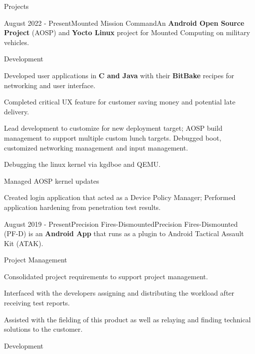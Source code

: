 \documentclass{article}
\newlength{\tabin}
\newlength{\secsep}
\newcommand{\lineunder}{\vspace*{-8pt} \\ \hspace*{-6pt} \hrulefill \\ \vspace*{-15pt}}
\newenvironment{tabbedsection}[1]{
	\begin{list}{}{
			\setlength{\itemsep}{0pt}
			\setlength{\labelsep}{0pt}
			\setlength{\labelwidth}{0pt}
			\setlength{\leftmargin}{0pt}
			\setlength{\rightmargin}{\tabin}
			\setlength{\listparindent}{0pt}
			\setlength{\parsep}{0pt}
			\setlength{\parskip}{0pt}
			\setlength{\partopsep}{0pt}
			\setlength{\topsep}{#1}
		}
		\item[]
	}{\end{list}}
\newenvironment{resume_section}[1]{
	\filbreak
	\vspace{2\secsep}
	\textsc{\color{blue}\large#1}
	\lineunder
	\begin{tabbedsection}{\secsep}
	}{\end{tabbedsection}}
\newenvironment{resume_project_subsection}[3]{
	\textbf{\color{BlueViolet}#2} \hfill \hspace{-5em} {\normalsize (#1)}
	\\ {\small \textit{ #3}}
	\begin{tabbedsection}{0.5\secsep}
		\begin{subitems}
		}{\end{subitems}\end{tabbedsection}}
\newenvironment{subitems}{
	\renewcommand{\labelitemi}{-}
	\begin{itemize}
		\setlength{\labelsep}{1em}
	}{\end{itemize}}
\newenvironment{resume_skill_group}[1]{
	\hspace{-18pt}\textbf{#1}
	\begin{itemize}
	}{\end{itemize}}
\begin{document}
\begin{resume_section}{Projects}
\begin{resume_project_subsection}{August 2022 - Present}{Mounted Mission Command}{An \textbf{Android Open Source Project} (AOSP) and \textbf{Yocto Linux} project for Mounted Computing on military vehicles.}
			\begin{resume_skill_group}{Development}
				\item 
				\item  
				Developed user applications in \textbf{C and Java} with their \textbf{BitBake} recipes for networking and user interface. 
				\item 
				Completed critical UX feature for customer saving money and potential late delivery.
				\item 
				Lead development to customize for new deployment target; AOSP build management to support multiple custom lunch targets. Debugged boot, customized networking management and input management.
				\item
				Debugging the linux kernel via kgdboe and QEMU.
				\item
				Managed AOSP kernel updates
				\item
				Created login application that acted as a Device Policy Manager; Performed application hardening from penetration test results.
			\end{resume_skill_group}
		\end{resume_project_subsection}
		\vspace{2\secsep}
		\begin{resume_project_subsection}{August 2019 - Present}{Precision Fires-Dismounted}{Precision Fires-Dismounted (PF-D) is an \textbf{Android App} that runs as a plugin to Android Tactical Assault Kit (ATAK).}			
			\begin{resume_skill_group}{Project Management}
				\item 
				\item 
					Consolidated project requirements to support project management. 
				\item 
					Interfaced with the developers assigning and distributing the workload after receiving test reports.
				\item 
					Assisted with the fielding of this product as well as relaying and finding technical solutions to the customer. 
				\end{resume_skill_group}
				
				\begin{resume_skill_group}{Development}
						\item 
				

\end{resume_skill_group}
\end{resume_project_subsection}
\end{resume_section}
\end{document}
